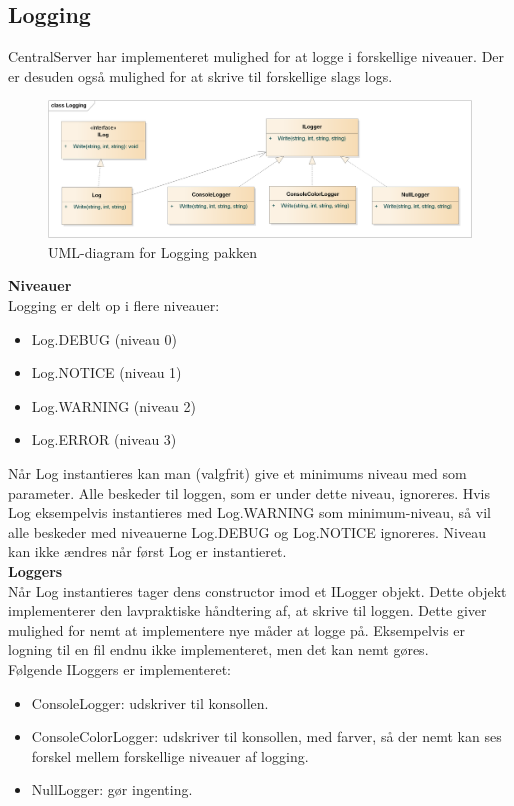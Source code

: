 \subsection{Logging}
CentralServer har implementeret mulighed for at logge i forskellige niveauer. Der er desuden også mulighed for at skrive til forskellige slags logs.

\begin{figure}[H]
    \centering
    \includegraphics[width=1\textwidth]{Systemdesign/CentralServer/Images/Logging.png}
    \caption{UML-diagram for Logging pakken}
    \label{fig:CSLogging}
\end{figure}

\textbf{Niveauer}\\
Logging er delt op i flere niveauer:

\begin{itemize}
  \item Log.DEBUG (niveau 0)
  \item Log.NOTICE (niveau 1)
  \item Log.WARNING (niveau 2)
  \item Log.ERROR (niveau 3)
\end{itemize}

Når Log instantieres kan man (valgfrit) give et minimums niveau med som parameter. Alle beskeder til loggen, som er under dette niveau, ignoreres. Hvis Log eksempelvis instantieres med Log.WARNING som minimum-niveau, så vil alle beskeder med niveauerne Log.DEBUG og Log.NOTICE ignoreres. Niveau kan ikke ændres når først Log er instantieret.\\

\textbf{Loggers}\\
Når Log instantieres tager dens constructor imod et ILogger objekt. Dette objekt implementerer den lavpraktiske håndtering af, at skrive til loggen. Dette giver mulighed for nemt at implementere nye måder at logge på. Eksempelvis er logning til en fil endnu ikke implementeret, men det kan nemt gøres.\\

Følgende ILoggers er implementeret:

\begin{itemize}
  \item ConsoleLogger: udskriver til konsollen.
  \item ConsoleColorLogger: udskriver til konsollen, med farver, så der nemt kan ses forskel mellem forskellige niveauer af logging.
  \item NullLogger: gør ingenting.
\end{itemize}

